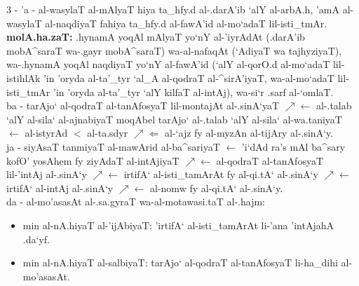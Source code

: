 3 - 'a - al-wasylaT al-mAlyaT hiya ta_hfy.d al-.darA'ib `alY al-arbA.h, 'amA
    al-wasylaT al-naqdiyaT fahiya ta_hfy.d al-fawA'id al-mo`adaT lil-isti_tmAr.
    \smallskip
    \hspace{15pt}
    \textbf{molA.ha.zaT: } .hynamA yoqAl mAlyaT yo`nY al-'iyrAdAt (.darA'ib 
        mobA^saraT wa-.gayr mobA^saraT) wa-al-nafaqAt (`AdiyaT wa tajhyziyaT),
        wa-.hynamA yoqAl naqdiyaT yo`nY al-fawA'id (`alY al-qorO.d al-mo`adaT
        lil-istihlAk 'in 'oryda al-ta'_tyr `al_A al-qodraT al-^sirA'iyaT,
        wa-al-mo`adaT lil-isti_tmAr 'in 'oryda al-ta'_tyr `alY kilfaT al-intAj),
        wa-si`r .sarf al-`omlaT.\\
    \hspace{15pt}
    ba - tarAjo` al-qodraT al-tanAfosyaT lil-montajAt al-.sinA`yaT
        $\nearrow\leftarrow$ al-.talab `alY al-sila` al-ajnabiyaT moqAbel tarAjo`
        al-.talab `alY al-sila` al-wa.taniyaT
        $\leftarrow$ al-istyrAd $<$ al-ta.sdyr
        $\nearrow\Leftarrow$ al-`ajz fy al-myzAn al-tijAry al-.sinA`y.\\
    \hspace{15pt}
    ja - siyAsaT tanmiyaT al-mawArid al-ba^sariyaT
        $\leftarrow$ 'i`dAd ra's mAl ba^sary kofO' yosAhem fy ziyAdaT
            al-intAjiyaT
        $\nearrow\leftarrow$ al-qodraT al-tanAfosyaT lil-'intAj al-.sinA`y
        $\nearrow\leftarrow$ irtifA` al-isti_tamArAt fy al-qi.tA` al-.sinA`y
        $\nearrow\leftarrow$ irtifA` al-intAj al-.sinA`y
        $\nearrow\leftarrow$ al-nomw fy al-qi.tA` al-.sinA`y.\\
    \hspace{15pt}
    da - al-mo'asasAt al-.sa.gyraT wa-al-motawasi.taT al-.hajm:
        \begin{itemize}
            \item min al-nA.hiyaT al-'ijAbiyaT: 'irtifA` al-isti_tamArAt li-'ana
                'intAjahA .da`yf.
            \item min al-nA.hiyaT al-salbiyaT: tarAjo` al-qodraT al-tanAfosyaT
                li-ha_dihi al-mo'asasAt.
        \end{itemize}
